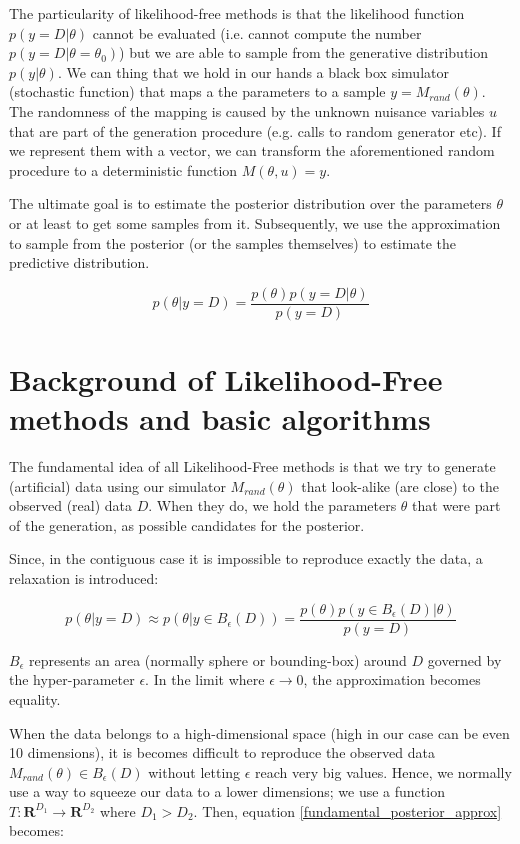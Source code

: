 \documentclass{article}
\begin{document}
The particularity of likelihood-free methods is that the likelihood function $p(y=D|\theta)$ cannot be evaluated (i.e. cannot compute the number $p(y=D|\theta=\theta_0)$) but we are able to sample from the generative distribution $p(y|\theta)$. We can thing that we hold in our hands a black box simulator (stochastic function) that maps a the parameters to a sample $y = M_{rand}(\theta)$. The randomness of the mapping is caused by the unknown nuisance variables $u$ that are part of the generation procedure (e.g. calls to random generator etc). If we represent them with a vector, we can transform the aforementioned random procedure to a deterministic function $M(\theta, u) = y$.  

The ultimate goal is to estimate the posterior distribution over the parameters $\theta$ or at least to get some samples from it. Subsequently, we use the approximation to sample from the posterior (or the samples themselves) to estimate the predictive distribution. 

\begin{equation}
    p(\theta|y=D) = \frac{p(\theta) p(y=D|\theta)}{p(y=D)}
\end{equation}


\section{Background of Likelihood-Free methods and basic algorithms}

The fundamental idea of all Likelihood-Free methods is that we try to generate (artificial) data using our simulator $M_{rand}(\theta)$ that look-alike (are close) to the observed (real) data $D$. When they do, we hold the parameters $\theta$ that were part of the generation, as possible candidates for the posterior.

Since, in the contiguous case it is impossible to reproduce exactly the data, a relaxation is introduced:

\begin{equation} \label{fundamental_posterior_approx}
    p(\theta|y=D) \approx p(\theta|y \in B_\epsilon(D)) = \frac{p(\theta) p(y \in B_\epsilon(D)|\theta)}{p(y=D)}
\end{equation}

$B_\epsilon$ represents an area (normally sphere or bounding-box) around $D$ governed by the hyper-parameter $\epsilon$. In the limit where $\epsilon \rightarrow 0$, the approximation becomes equality.

When the data belongs to a high-dimensional space (high in our case can be even 10 dimensions), it is becomes difficult to reproduce the observed data $M_{rand}(\theta) \in B_{\epsilon}(D)$ without letting $\epsilon$ reach very big values. Hence, we normally use a way to squeeze our data to a lower dimensions; we use a function $T:\mathbf{R}^{D_1} \rightarrow \mathbf{R}^{D_2}$ where $D_1 > D_2$. Then, equation \ref{fundamental_posterior_approx} becomes:
\end{document}
